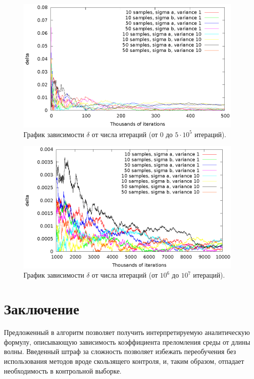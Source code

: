 \documentclass[12pt,a4paper]{article}
\begin{document}
\begin{figure}[h]
  \centering
  \includegraphics[scale=1.2]{figs/classic/variance_all_0_500.eps}
  \caption{График зависимости $\delta$ от числа итераций (от 0 до $5 \cdot 10^5$ итераций).}
  \label{fig:classic_all_0_500}
\end{figure}

\begin{figure}[h]
  \centering
  \includegraphics[scale=1.2]{figs/classic/variance_all_1000_all.eps}
  \caption{График зависимости $\delta$ от числа итераций (от $10^6$ до $10^7$ итераций).}
  \label{fig:classic_all_1000_all}
\end{figure}

\FloatBarrier

\section{Заключение}

Предложенный в \cite{Rudoy13} алгоритм позволяет получить интерпретируемую аналитическую
формулу, описывающую зависимость коэффициента преломления среды от длины волны.
Введенный штраф за сложность позволяет избежать переобучения без использования методов
вроде скользящего контроля, и, таким образом, отпадает необходимость в контрольной выборке.
\end{document}
